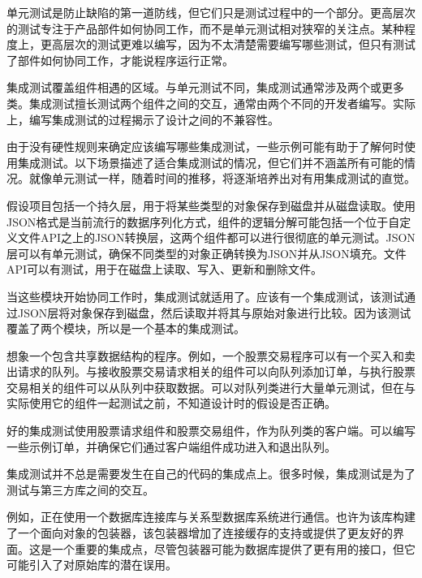 
单元测试是防止缺陷的第一道防线，但它们只是测试过程中的一个部分。更高层次的测试专注于产品部件如何协同工作，而不是单元测试相对狭窄的关注点。某种程度上，更高层次的测试更难以编写，因为不太清楚需要编写哪些测试，但只有测试了部件如何协同工作，才能说程序运行正常。


集成测试覆盖组件相遇的区域。与单元测试不同，集成测试通常涉及两个或更多类。集成测试擅长测试两个组件之间的交互，通常由两个不同的开发者编写。实际上，编写集成测试的过程揭示了设计之间的不兼容性。


由于没有硬性规则来确定应该编写哪些集成测试，一些示例可能有助于了解何时使用集成测试。以下场景描述了适合集成测试的情况，但它们并不涵盖所有可能的情况。就像单元测试一样，随着时间的推移，将逐渐培养出对有用集成测试的直觉。


假设项目包括一个持久层，用于将某些类型的对象保存到磁盘并从磁盘读取。使用JSON格式是当前流行的数据序列化方式，组件的逻辑分解可能包括一个位于自定义文件API之上的JSON转换层，这两个组件都可以进行很彻底的单元测试。JSON层可以有单元测试，确保不同类型的对象正确转换为JSON并从JSON填充。文件API可以有测试，用于在磁盘上读取、写入、更新和删除文件。

当这些模块开始协同工作时，集成测试就适用了。应该有一个集成测试，该测试通过JSON层将对象保存到磁盘，然后读取并将其与原始对象进行比较。因为该测试覆盖了两个模块，所以是一个基本的集成测试。


想象一个包含共享数据结构的程序。例如，一个股票交易程序可以有一个买入和卖出请求的队列。与接收股票交易请求相关的组件可以向队列添加订单，与执行股票交易相关的组件可以从队列中获取数据。可以对队列类进行大量单元测试，但在与实际使用它的组件一起测试之前，不知道设计时的假设是否正确。

好的集成测试使用股票请求组件和股票交易组件，作为队列类的客户端。可以编写一些示例订单，并确保它们通过客户端组件成功进入和退出队列。


集成测试并不总是需要发生在自己的代码的集成点上。很多时候，集成测试是为了测试与第三方库之间的交互。

例如，正在使用一个数据库连接库与关系型数据库系统进行通信。也许为该库构建了一个面向对象的包装器，该包装器增加了连接缓存的支持或提供了更友好的界面。这是一个重要的集成点，尽管包装器可能为数据库提供了更有用的接口，但它可能引入了对原始库的潜在误用。

